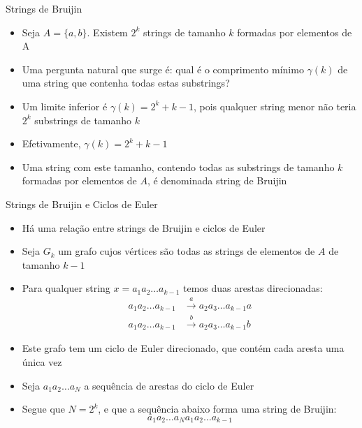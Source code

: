 \begin{frame}[fragile]{Strings de Bruijin}

    \begin{itemize}
        \item Seja $A = \lbrace a, b\rbrace$. Existem $2^k$ strings de tamanho $k$ formadas por 
            elementos de A
        \pause

        \item Uma pergunta natural que surge é: qual é o comprimento mínimo $\gamma(k)$ de uma 
            string que contenha todas estas substrings?
        \pause

        \item Um limite inferior é $\gamma(k) = 2^k + k - 1$, pois qualquer string menor não teria 
            $2^k$ substrings de tamanho $k$
        \pause

        \item Efetivamente, $\gamma(k) = 2^k + k - 1$
        \pause

        \item Uma string com este tamanho, contendo todas as substrings de tamanho $k$ formadas 
            por elementos de $A$, é denominada string de Bruijin

    \end{itemize}

\end{frame}

\begin{frame}[fragile]{Strings de Bruijin e Ciclos de Euler}

    \begin{itemize}
        \item Há uma relação entre strings de Bruijin e ciclos de Euler
        \pause

        \item Seja $G_k$ um grafo cujos vértices são todas as strings de elementos de $A$ de 
            tamanho $k - 1$
        \pause

        \item Para qualquer string $x = a_1a_2\ldots a_{k-1}$ temos duas arestas direcionadas:
            \begin{align*}
                a_1a_2\ldots a_{k-1} &\xrightarrow{\ a\ } a_2a_3\ldots a_{k-1}a \\
                a_1a_2\ldots a_{k-1} &\xrightarrow{\ b\ } a_2a_3\ldots a_{k-1}b
            \end{align*}
        \pause

        \item Este grafo tem um ciclo de Euler direcionado, que contém cada aresta uma única vez
        \pause

        \item Seja $a_1a_2\ldots a_N$ a sequência de arestas do ciclo de Euler
        \pause

        \item Segue que $N = 2^k$, e que a sequência abaixo forma uma string de Bruijin:
        \[
            a_1a_2\ldots a_Na_1a_2\ldots a_{k-1}
        \]
 
   \end{itemize}

\end{frame}
